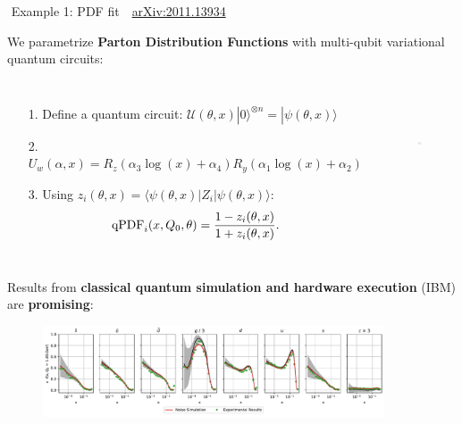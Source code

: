 \documentclass[aspectratio=169, 8pt, xcolor={svgnames}, hyperref={linkcolor=black}]{beamer}
\begin{document}
\begin{frame}[fragile]{\faTerminal\,\,Example 1: PDF fit \hfill \faBook\,\, \href{https://arxiv.org/abs/2011.13934}{arXiv:2011.13934}}

  \small
  We parametrize \textbf{Parton Distribution Functions} with multi-qubit variational quantum circuits:
  \begin{columns}
    \column{6cm}
    \begin{itemize}
      \item[1.] Define a quantum circuit: $\mathcal{U}(\theta, x) | 0 \rangle ^ {\otimes n} = | \psi (\theta, x) \rangle$
      \item[2.] $U_w (\alpha, x) = R_z(\alpha_3 \log(x) + \alpha_4) R_y(\alpha_1 \log(x) + \alpha_2)$
      \item[3.] Using $z_i (\theta, x) = \langle \psi (\theta, x) | Z_i | \psi (\theta, x) \rangle$:
      \begin{equation*}
        {\rm qPDF}_i (x, Q_0, \theta) = \frac{1-z_i (\theta, x)}{1+z_i(\theta, x)}.
      \end{equation*}
    \end{itemize}

    \column{4cm}
    \vspace{-0.2cm}
    \begin{figure}
      \includegraphics[height=3cm]{figures/layer.pdf}
    \end{figure}
  \end{columns}

  Results from \textbf{\color{teal} classical quantum simulation and hardware execution} (IBM) are \textbf{promising}:
  \begin{figure}
    \includegraphics[width=0.9\textwidth]{figures/Experiments-SingleFlavor.pdf}
  \end{figure}

\end{frame}
\end{document}
